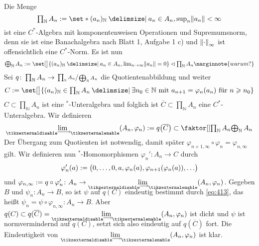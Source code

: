 \begin{beweis}
	Die Menge
	\[
		\textstyle\prod_\mathbb{N} A_n := \set*{(a_n)_\mathbb{N} \given a_n \in A_n, \sup_n \norm*{a_n} < \infty}
	\]
	ist eine $C^*$-Algebra mit komponentenweisen Operationen und Supremumsnorm, denn sie ist eine Banachalgebra nach Blatt 1, Aufgabe 1 c) und $\norm*{\cdot}_\infty$ ist offensichtlich eine $C^*$-Norm.
	Es ist nun
	\[
		\textstyle\bigoplus_\mathbb{N} A_n := \set[\big]{(a_n)_\mathbb{N} \given a_n \in A_n , \lim_{n \to \infty} \norm*{a_n}=0} \lhd \prod_\mathbb{N} A_n \marginnote{warum?}
	\]
	Sei $q \colon \prod_\mathbb{N} A_n \to \sfrac{\prod_\mathbb{N} A_n}{\bigoplus_\mathbb{N} A_n}$ die Quotientenabbildung und weiter
	\[
		\textstyle C := \set[\big]{(a_n)_\mathbb{N} \in \prod\nolimits_\mathbb{N} A_n \given  \exists n_0 \in \mathbb{N} \text{ mit } a_{n+1}= \varphi_n(a_n) \text{ für } n \ge n_0}
	\]
	$C \subset \prod_\mathbb{N} A_n$ ist eine $^*$-Unteralgebra und folglich ist $\overline{C} \subset \prod_\mathbb{N} A_n$ eine $C^*$-Unteralgebra.
	Wir definieren 
	\[
		\Dlim(A_n,\varphi_n) := q \enbrace*{\overline{C}} \subset \Faktor{\prod\nolimits_\mathbb{N} A_n}{\bigoplus\nolimits_\mathbb{N} A_n}
	\]
	Der Übergang zum Quotienten ist notwendig, damit später $\varphi_{n+1,\infty} \circ \varphi_{n} = \varphi_{n,\infty}$ gilt.
	Wir definieren nun $^*$-Homomorphismen $\varphi_n' \colon A_n \to C$ durch 
	\[
		\varphi_n'(a) := \enbrace[\big]{0, \ldots ,0,a,\varphi_n(a), \varphi_{n+1}(\varphi_n(a)),\ldots } 
	\]
	und $\varphi_{n,\infty} := q \circ \varphi_n' \colon A_n \to \Dlim(A_n,\varphi_n)$. 
	Gegeben $B$ und $\psi_n \colon A_n \to B$, so ist $\psi$ auf $q(C)$ eindeutig bestimmt durch \eqref{eq:413}, das heißt $\psi_n = \psi \circ \varphi_{n,\infty} \colon A_n \to B$.
	Aber $q(C) \subset q(\overline{C})= \Dlim(A_n,\varphi_n)$ ist dicht und $\psi$ ist normvermindernd auf $q(C)$, setzt sich also eindeutig auf $q(\overline{C})$ fort.
	Die Eindeutigkeit von $\Dlim (A_n,\varphi_n)$ ist klar.
\end{beweis}

